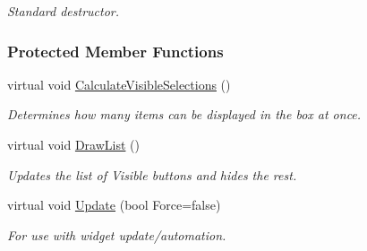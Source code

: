 \begin{DoxyCompactItemize}
\begin{DoxyCompactList}\small\item\em Standard destructor. \item\end{DoxyCompactList}\end{DoxyCompactItemize}
\subsubsection*{Protected Member Functions}
\begin{DoxyCompactItemize}
\item 
\hypertarget{classphys_1_1UI_1_1ButtonListBox_a1b8d7f3de8e241c940f022ea5b5e1c97}{
virtual void \hyperlink{classphys_1_1UI_1_1ButtonListBox_a1b8d7f3de8e241c940f022ea5b5e1c97}{CalculateVisibleSelections} ()}
\label{classphys_1_1UI_1_1ButtonListBox_a1b8d7f3de8e241c940f022ea5b5e1c97}

\begin{DoxyCompactList}\small\item\em Determines how many items can be displayed in the box at once. \item\end{DoxyCompactList}\item 
\hypertarget{classphys_1_1UI_1_1ButtonListBox_a6fbb3046819a0dace3a178a752efe652}{
virtual void \hyperlink{classphys_1_1UI_1_1ButtonListBox_a6fbb3046819a0dace3a178a752efe652}{DrawList} ()}
\label{classphys_1_1UI_1_1ButtonListBox_a6fbb3046819a0dace3a178a752efe652}

\begin{DoxyCompactList}\small\item\em Updates the list of Visible buttons and hides the rest. \item\end{DoxyCompactList}\item 
\hypertarget{classphys_1_1UI_1_1ButtonListBox_a4c412be3030aea2e3ca2ce946a4cdd26}{
virtual void \hyperlink{classphys_1_1UI_1_1ButtonListBox_a4c412be3030aea2e3ca2ce946a4cdd26}{Update} (bool Force=false)}
\label{classphys_1_1UI_1_1ButtonListBox_a4c412be3030aea2e3ca2ce946a4cdd26}

\begin{DoxyCompactList}\small\item\em For use with widget update/automation. \item\end{DoxyCompactList}\end{DoxyCompactItemize}
